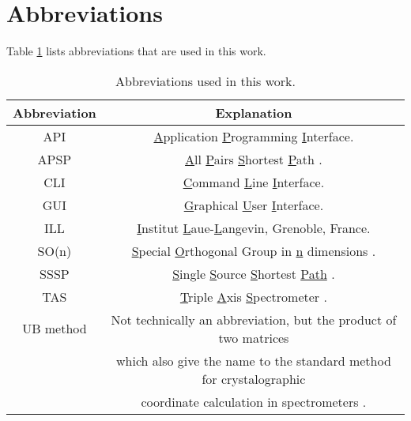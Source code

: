 \section{Abbreviations}
Table \ref{tab:abbreviations} lists abbreviations that are used in this work.

\begin{table}[htb]
	\centering
	\begin{tabular}{|c|c|}
		\hline
		\bf{Abbreviation} & \bf{Explanation} \tabularnewline
		\hline
		API		 & \underline{A}pplication \underline{P}rogramming \underline{I}nterface. \tabularnewline
		\hline
		APSP		 & \underline{A}ll \underline{P}airs \underline{S}hortest \underline{P}ath \cite[pp. 309-320]{Erickson2019}. \tabularnewline
		\hline
		CLI              & \underline{C}ommand \underline{L}ine \underline{I}nterface. \tabularnewline
		\hline
		GUI              & \underline{G}raphical \underline{U}ser \underline{I}nterface. \tabularnewline
		\hline
		ILL              & \underline{I}nstitut \underline{L}aue-\underline{L}angevin, Grenoble, France. \tabularnewline
		\hline
		SO(n)            & \underline{S}pecial \underline{O}rthogonal Group in \underline{n} dimensions \cite[pp. 849-851]{Arfken2013}. \tabularnewline
		\hline
		SSSP		 & \underline{S}ingle \underline{S}ource \underline{S}hortest \underline{Path} \cite[pp. 273-297]{Erickson2019}. \tabularnewline
		\hline
		TAS              & \underline{T}riple \underline{A}xis \underline{S}pectrometer \cite{Shirane2002}. \tabularnewline
		\hline
		UB method        & Not technically an abbreviation, but the product of two matrices \tabularnewline
		                          & which also give the name to the standard method for crystalographic \tabularnewline
		                          & coordinate calculation in spectrometers \cite{Lumsden2005}. \tabularnewline
		\hline
	\end{tabular}
	\caption[Abbreviations]{Abbreviations used in this work.}
	\label{tab:abbreviations}
\end{table}
